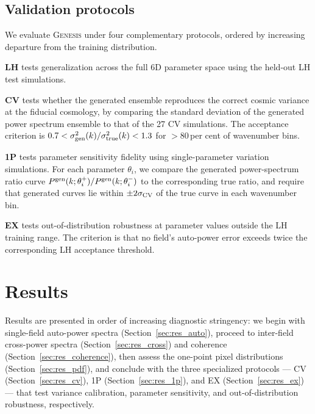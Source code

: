 \documentclass[usenatbib]{mnras}
\begin{document}
\subsection{Validation protocols}
\label{sec:protocols}

We evaluate \textsc{Genesis} under four complementary protocols, ordered
by increasing departure from the training distribution.

\textbf{LH} tests generalization across the full 6D parameter space
using the held-out LH test simulations.

\textbf{CV} tests whether the generated ensemble reproduces the correct
cosmic variance at the fiducial cosmology, by comparing the standard
deviation of the generated power spectrum ensemble to that of the 27 CV
simulations.
The acceptance criterion is
$0.7 < \sigma^2_{\rm gen}(k) / \sigma^2_{\rm true}(k) < 1.3$ for
$> 80$\,per cent of wavenumber bins.

\textbf{1P} tests parameter sensitivity fidelity using
single-parameter variation simulations.
For each parameter $\theta_i$, we compare the generated power-spectrum
ratio curve
$P^{\rm gen}(k; \theta_i^+)/P^{\rm gen}(k; \theta_i^-)$ to the
corresponding true ratio, and require that generated curves lie within
$\pm 2\sigma_{\rm CV}$ of the true curve in each wavenumber bin.

\textbf{EX} tests out-of-distribution robustness at parameter values
outside the LH training range.
The criterion is that no field's auto-power error exceeds twice the
corresponding LH acceptance threshold.

\section{Results}
\label{sec:results}

Results are presented in order of increasing diagnostic stringency: we
begin with single-field auto-power spectra
(Section~\ref{sec:res_auto}), proceed to inter-field cross-power
spectra (Section~\ref{sec:res_cross}) and coherence
(Section~\ref{sec:res_coherence}), then assess the one-point pixel
distributions (Section~\ref{sec:res_pdf}), and conclude with the three
specialized protocols --- CV (Section~\ref{sec:res_cv}), 1P
(Section~\ref{sec:res_1p}), and EX (Section~\ref{sec:res_ex}) --- that
test variance calibration, parameter sensitivity, and
out-of-distribution robustness, respectively.
\end{document}
